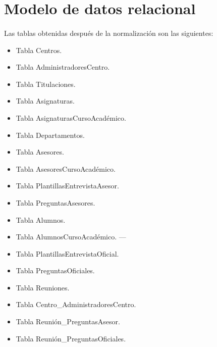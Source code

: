\section{Modelo de datos relacional}

  \paragraph{}Las tablas obtenidas después de la normalización son las
  siguientes:

  \begin{itemize}
   \item Tabla Centros.
   \item Tabla AdministradoresCentro.
   \item Tabla Titulaciones.
   \item Tabla Asignaturas.
   \item Tabla AsignaturasCursoAcadémico.
   \item Tabla Departamentos.
   \item Tabla Asesores.
   \item Tabla AsesoresCursoAcadémico.
   \item Tabla PlantillasEntrevistaAsesor.
   \item Tabla PreguntasAsesores.
   \item Tabla Alumnos.
   \item Tabla AlumnosCursoAcadémico.
---
   \item Tabla PlantillasEntrevistaOficial.
   \item Tabla PreguntasOficiales.
   \item Tabla Reuniones.
   \item Tabla Centro\_AdministradoresCentro.
   \item Tabla Reunión\_PreguntasAsesor.
   \item Tabla Reunión\_PreguntasOficiales.
  \end{itemize}

